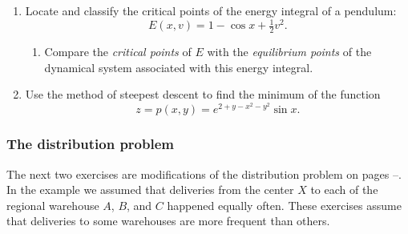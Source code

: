 \begin{enumerate}
  \begin{enumerate}
  \item Mark the locations of the critical points on a suitable contour
plot of $C(x, y)$.


\end{enumerate}
\item Locate and classify the critical points of the energy integral of
a pendulum:
        \[
E(x, v) = 1 - \cos{x} + \tfrac{1}{2}v^2.
\]


  \begin{enumerate}
  \item Compare the {\em critical points\/} of $E$ with the {\em
  equilibrium points\/} of the dynamical system associated with this
energy integral.



\end{enumerate}
\item Use the method of steepest descent to find the minimum of the function
        \[
z = p(x, y) =  e^{2 + y - x^2 - y^2} \sin{x}.
\]  

\end{enumerate}
\subsubsection{The distribution problem}
\label{subsubsec:the-distribution-problem}

The next two exercises are modifications of the distribution problem
on pages \pageref{distribstart}--\pageref{distribend}.  In the example
we assumed that deliveries from the center $X$ to each of the regional
warehouse $A$, $B$, and $C$ happened equally often.  These exercises
assume that deliveries to some warehouses are more frequent than
others.



